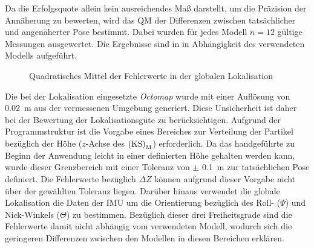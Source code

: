 %

Da die Erfolgsquote allein kein ausreichendes Maß darstellt, um die Präzision der Annäherung zu bewerten, wird das QM der Differenzen zwischen tatsächlicher und angenäherter Pose bestimmt. Dabei wurden für jedes Modell $n=12$ gültige Messungen ausgewertet. Die Ergebnisse sind in  in Abhängigkeit des verwendeten Modells aufgeführt.\\


\prever{
}

\begin{figure}

\caption{Quadratisches Mittel der Fehlerwerte in der globalen Lokalisation}
\label{fig.glob_loc}
\end{figure}


Die bei der Lokalisation eingesetzte \textit{Octomap} wurde mit einer Auflösung von \SI{0,02}{\meter} aus der vermessenen Umgebung generiert. Diese Unsicherheit ist daher bei der Bewertung der Lokalisationsgüte zu berücksichtigen. Aufgrund der Programmstruktur ist die Vorgabe eines Bereiches zur Verteilung der Partikel bezüglich der Höhe ($z$-Achse des ${\mathrm{(KS)}}_{\mathrm{M}}$) erforderlich. Da das handgeführte \kps{} zu Beginn der Anwendung leicht in einer definierten Höhe gehalten werden kann, wurde dieser Grenzbereich mit einer Toleranz von $\pm$ \SI{0,1}{\meter} zur tatsächlichen Pose definiert. Die Fehlerwerte bezüglich $\Delta Z$ können aufgrund dieser Vorgabe nicht über der gewählten Toleranz liegen. Darüber hinaus verwendet die globale Lokalisation die Daten der IMU um die Orientierung bezüglich des Roll- ($\Psi$) und Nick-Winkels ($\Theta$) zu bestimmen. Bezüglich dieser drei Freiheitsgrade sind die Fehlerwerte damit nicht abhängig vom verwendeten Modell, wodurch sich die geringeren Differenzen zwischen den Modellen in diesen Bereichen erklären.\\

